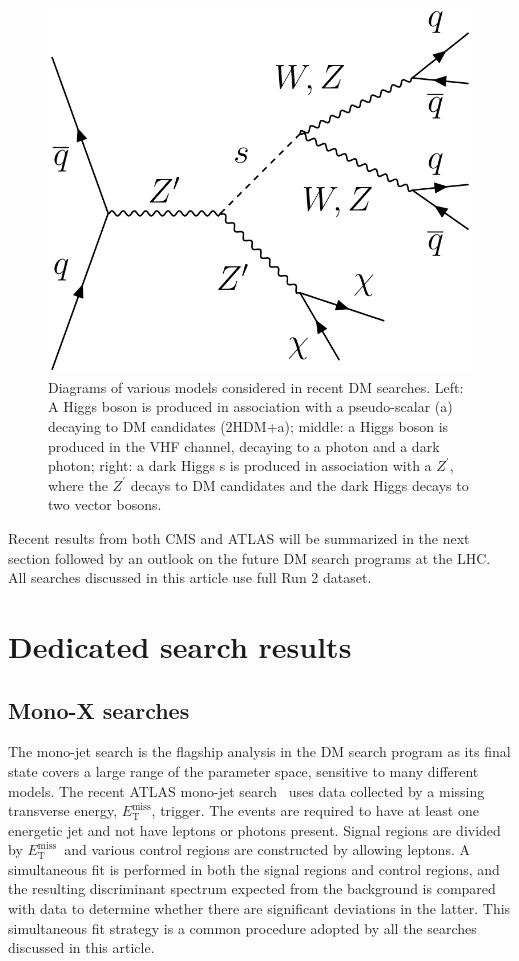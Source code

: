 \documentclass{moriond}
\def\et{E_\mathrm{T}^{\mathrm{miss}}}
\begin{document}
\begin{figure} [htb]
\begin{minipage}{0.32\linewidth}
\centerline{\includegraphics[width=0.7\linewidth]{MonoSVVDiagram}}
\end{minipage}
\caption[]{Diagrams of various models considered in recent DM searches. Left: A Higgs boson is produced in association with a pseudo-scalar (a) decaying to DM candidates (2HDM+a); middle: a Higgs boson is produced in the VHF channel, decaying to a photon and a dark photon; right: a dark Higgs s is produced in association with a $Z^{\prime}$, where the $Z^{\prime}$ decays to DM candidates and the dark Higgs decays to two vector bosons.}
\label{fig:diagrams}
\end{figure}

Recent results from both CMS and ATLAS will be summarized in the next section
followed by an outlook on the future DM search programs at the LHC. All
searches discussed in this article use full Run 2 dataset. 

\section{Dedicated search results}

\subsection{Mono-X searches}

The mono-jet search is the flagship analysis in the DM search program as its final
state covers a large range of the parameter space, sensitive to many different
models. The recent ATLAS mono-jet search~\cite{monojet} uses data collected by a missing transverse energy, $\et$,
trigger. The events are required to have at least one energetic jet and not
have leptons or photons present. Signal regions are divided by $\et$\ and various control regions are constructed by allowing leptons. A simultaneous fit is performed in both the signal regions and control regions, and the resulting discriminant spectrum expected from the background is compared with data to determine whether there are significant deviations in the latter. This simultaneous fit strategy is a common procedure adopted by all the searches discussed in this article.
\end{document}
